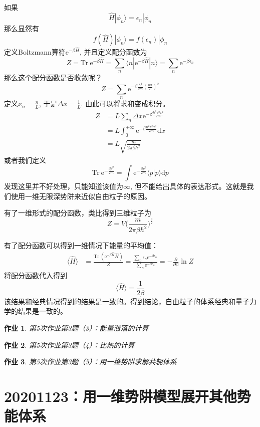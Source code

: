 \documentclass[12pt]{article}
\newtheorem{asg}{作业}
\begin{document}
如果
\[ \hat{H} | \phi_n \rangle = \epsilon_n |\phi_n \]
那么显然有
\[ f(\hat{H})|\phi_n \rangle = f(\epsilon_n)|\phi_n \]
定义Boltzmann算符$\mathrm{e}^{-\beta\hat{H}}$, 并且定义配分函数为
\[ Z = \mathrm{Tr}\  \mathrm{e}^{-\beta \hat{H}} = \sum_n \langle n| \mathrm{e}^{-\beta \hat{H}} | n \rangle = \sum_n \mathrm{e}^{-\beta \epsilon_n }\]
那么这个配分函数是否收敛呢？
\[ Z = \sum_n \mathrm{e}^{-\beta \frac {\hbar^2}{2m} (\frac {n\pi}L)^2} \]
定义$x_n = \frac nL$, 于是$\Delta x = \frac 1L$. 由此可以将求和变成积分。
\begin{align*}
    Z &= L \sum_n \Delta x \mathrm{e}^{-\beta \frac {\hbar^2\pi^2 x^2}{2m} }\\
    &= L \int_0^{+\infty} \mathrm{e}^{-\beta \frac {\hbar^2\pi^2 x^2}{2m}} \mathrm{d}x\\
    &= L\sqrt{\frac m{2\pi \beta \hbar^2}}
\end{align*}
或者我们定义
\[ \mathrm{Tr} \ \mathrm{e}^{-\frac {\beta \hat{p}^2}{2m}} = \int \mathrm{e}^{-\frac {\beta p^2}{2m}} \langle p|p\rangle \mathrm{d}p \]
发现这里并不好处理，只能知道该值为$\infty$, 但不能给出具体的表达形式。这就是我们使用一维无限深势阱来近似自由粒子的原因。

有了一维形式的配分函数，类比得到三维粒子为
\[ Z = V \bigg(\frac m{2\pi \beta \hbar^2}\bigg)^{\frac 32} \]

有了配分函数可以得到一维情况下能量的平均值：
\begin{align*}
    \langle \hat{H} \rangle &= \frac {\mathrm{Tr} \ (\mathrm{e}^{-\beta \hat{H}} \hat{H})}Z
    = \frac {\sum_n \epsilon_n \mathrm{e}^{-\beta \epsilon_n}}{\sum_n \mathrm{e}^{-\beta \epsilon_n}}
    = -\frac {\partial}{\partial \beta} \ln{Z}
\end{align*}
将配分函数代入得到
\[ \langle \hat{H} \rangle = \frac 1{2\beta} \]
该结果和经典情况得到的结果是一致的。得到结论，自由粒子的体系经典和量子力学的结果是一致的。
\begin{asg}
    第5次作业第3题（3）：能量涨落的计算
\end{asg}
\begin{asg}
    第5次作业第3题（4）：比热的计算
\end{asg}
\begin{asg}
    第5次作业第3题（5）：用一维势阱求解共轭体系
\end{asg}

\section{20201123：用一维势阱模型展开其他势能体系}
\end{document}
